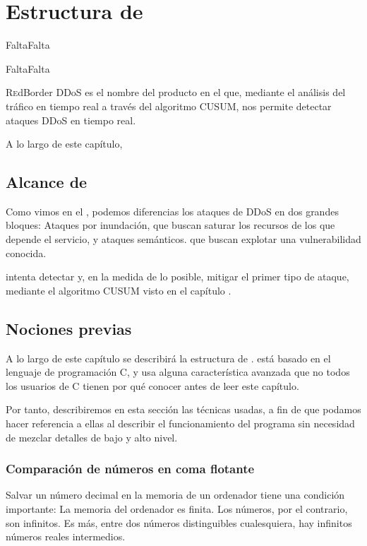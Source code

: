 \chapter{Estructura de \redborderddos}
\pagestyle{esitscCD}
\epigraph{  FaltaFalta }{FaltaFalta}

\lettrine[lraise=-0.1, lines=2, loversize=0.25]{R}edBorder DDoS es el nombre del producto en el 
que, mediante el análisis del tráfico en tiempo real a través del algoritmo \gls{CUSUM}, nos permite detectar ataques 
\gls{DDoS} en tiempo real.

A lo largo de este capítulo, %

\section{Alcance de \redborderddos} %
Como vimos en el , podemos diferencias los ataques de \gls{DDoS} en dos grandes bloques: 
Ataques por inundación, que buscan saturar los recursos de los que depende el servicio, y ataques semánticos. que 
buscan explotar una vulnerabilidad conocida.

\redborderddos{} intenta detectar y, en la medida de lo posible, mitigar el primer tipo de ataque, mediante el 
algoritmo \gls{CUSUM} visto en el capítulo . 

\section{Nociones previas}


A lo largo de este capítulo se describirá la estructura de \redborderddos. \redborderddos{} está basado en el lenguaje 
de programación C, y usa alguna característica avanzada que no todos los usuarios de C tienen por qué conocer antes de 
leer este capítulo.

Por tanto, describiremos en esta sección las técnicas usadas, a fin de que podamos hacer referencia a ellas al 
describir el funcionamiento del programa sin necesidad de mezclar detalles de bajo y alto nivel.

\subsection{Comparación de números en coma flotante}
Salvar un número decimal en la memoria de un ordenador tiene una condición importante: La memoria del ordenador es 
finita. Los números, por el contrario, son infinitos. Es más, entre dos números distinguibles cualesquiera, hay 
infinitos números reales intermedios.

